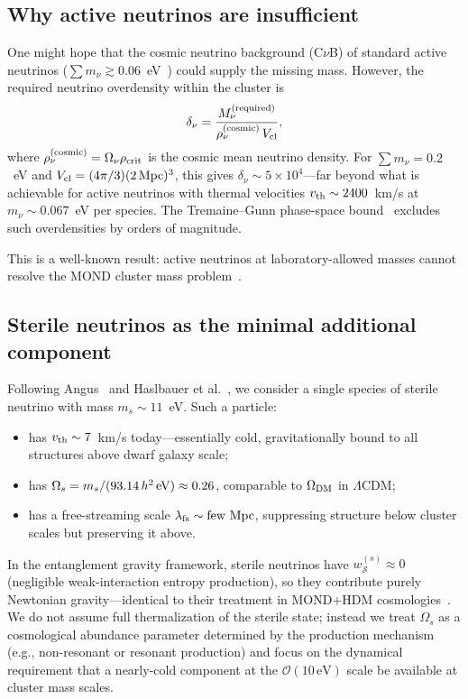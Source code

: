 \documentclass[aps,prd,twocolumn,superscriptaddress,nofootinbib]{revtex4-2}
\newcommand{\wS}{w_{\mathcal{S}}}
\begin{document}
\subsection{Why active neutrinos are insufficient}

One might hope that the cosmic neutrino background (C$\nu$B) of standard active neutrinos ($\sum m_\nu\gtrsim 0.06$~eV~\cite{Esteban2020}) could supply the missing mass. However, the required neutrino overdensity within the cluster is
\begin{equation}
\delta_\nu = \frac{M_\nu^{\rm (required)}}{\rho_\nu^{\rm (cosmic)}\,V_{\rm cl}},
\label{eq:deltanu_correct}
\end{equation}
where $\rho_\nu^{\rm (cosmic)}=\Omega_\nu\rho_{\rm crit}$ is the cosmic mean neutrino density. For $\sum m_\nu=0.2$~eV and $V_{\rm cl}=(4\pi/3)(2\,{\rm Mpc})^3$, this gives $\delta_\nu\sim 5\times 10^4$---far beyond what is achievable for active neutrinos with thermal velocities $v_{\rm th}\sim 2400$~km/s at $m_\nu\sim 0.067$~eV per species. The Tremaine--Gunn phase-space bound~\cite{TremaineGunn1979} excludes such overdensities by orders of magnitude.

This is a well-known result: active neutrinos at laboratory-allowed masses cannot resolve the MOND cluster mass problem~\cite{Sanders2003,Angus2008}.

\subsection{Sterile neutrinos as the minimal additional component}

Following Angus~\cite{Angus2009} and Haslbauer et al.~\cite{Haslbauer2020}, we consider a single species of sterile neutrino with mass $m_s\sim 11$~eV. Such a particle:
\begin{itemize}
\item has $v_{\rm th}\sim 7$~km/s today---essentially cold, gravitationally bound to all structures above dwarf galaxy scale;
\item has $\Omega_s = m_s/(93.14\,h^2\,{\rm eV})\approx 0.26$, comparable to $\Omega_{\rm DM}$ in $\Lambda$CDM;
\item has a free-streaming scale $\lambda_{\rm fs}\sim\text{few Mpc}$, suppressing structure below cluster scales but preserving it above.
\end{itemize}

In the entanglement gravity framework, sterile neutrinos have $\wS^{(s)}\approx 0$ (negligible weak-interaction entropy production), so they contribute purely Newtonian gravity---identical to their treatment in MOND+HDM cosmologies~\cite{Angus2009,Haslbauer2020}. We do not assume full thermalization of the sterile state; instead we treat $\Omega_s$ as a cosmological abundance parameter determined by the production mechanism (e.g., non-resonant or resonant production) and focus on the dynamical requirement that a nearly-cold component at the $\mathcal{O}(10\,\mathrm{eV})$ scale be available at cluster mass scales.
\end{document}
